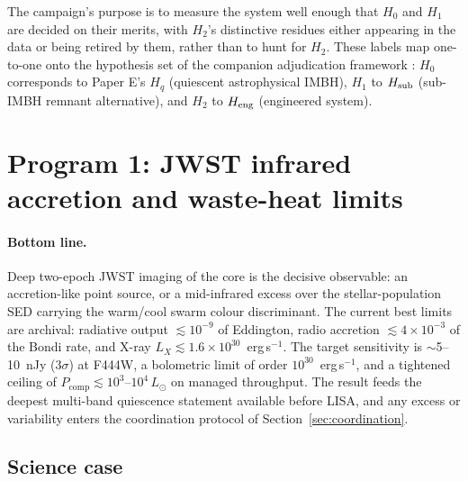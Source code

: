 \documentclass[11pt]{article}
\begin{document}
The campaign's purpose is to measure the system well enough that $H_0$ and $H_1$ are decided on their merits, with $H_2$'s distinctive residues either appearing in the data or being retired by them, rather than to hunt for $H_2$. These labels map one-to-one onto the hypothesis set of the companion adjudication framework \citep[hereafter Paper E]{Swanson2026Engineered}: $H_0$ corresponds to Paper E's $H_q$ (quiescent astrophysical IMBH), $H_1$ to $H_{\rm sub}$ (sub-IMBH remnant alternative), and $H_2$ to $H_{\rm eng}$ (engineered system).

\section{Program 1: JWST infrared accretion and waste-heat limits}
\label{sec:jwst}

\paragraph{Bottom line.} Deep two-epoch JWST imaging of the core is the decisive observable: an accretion-like point source, or a mid-infrared excess over the stellar-population SED carrying the warm/cool swarm colour discriminant. The current best limits are archival: radiative output $\lesssim 10^{-9}$ of Eddington, radio accretion $\lesssim 4\times10^{-3}$ of the Bondi rate, and X-ray $L_{X} \lesssim 1.6\times10^{30}$~erg\,s$^{-1}$. The target sensitivity is $\sim$5--10~nJy ($3\sigma$) at F444W, a bolometric limit of order $10^{30}$~erg\,s$^{-1}$, and a tightened ceiling of $P_{\mathrm{comp}} \lesssim 10^{3}$--$10^{4}\,L_\odot$ on managed throughput. The result feeds the deepest multi-band quiescence statement available before LISA, and any excess or variability enters the coordination protocol of Section~\ref{sec:coordination}.

\subsection{Science case}
\end{document}

